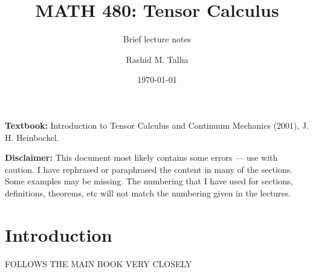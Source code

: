 \documentclass[11pt]{penrose}
\title{MATH 480: Tensor Calculus}
\subtitle{Brief lecture notes}
\author{Rashid M. Talha}
\affiliation{School of Natural Sciences, NUST}
\date{\today}
\begin{document}
\maketitle

\textbf{Textbook:} Introduction to Tensor Calculus and Continuum Mechanics (2001), J. H. Heinbockel.

\textbf{Disclaimer:} This document most likely contains some errors --- use with caution. I have rephrased or paraphrased the content in many of the sections. Some examples may be missing. The numbering that I have used for sections, definitions, theorems, etc will not match the numbering given in the lectures.

\section{Introduction}

FOLLOWS THE MAIN BOOK VERY CLOSELY
\end{document}
